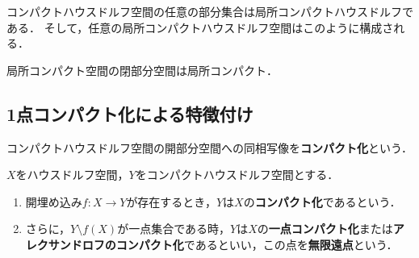 \documentclass[uplatex,dvipdfmx]{jsreport}
\begin{document}
\begin{example}
    コンパクトハウスドルフ空間の任意の部分集合は局所コンパクトハウスドルフである．
    そして，任意の局所コンパクトハウスドルフ空間はこのように構成される．
\end{example}

\begin{example}
    局所コンパクト空間の閉部分空間は局所コンパクト．
\end{example}

\subsection{1点コンパクト化による特徴付け}

\begin{tcolorbox}[colframe=ForestGreen, colback=ForestGreen!10!white,breakable,colbacktitle=ForestGreen!40!white,coltitle=black,fonttitle=\bfseries\sffamily,
title=]
    コンパクトハウスドルフ空間の開部分空間への同相写像を\textbf{コンパクト化}という．
\end{tcolorbox}

\begin{definition}
    $X$をハウスドルフ空間，$Y$をコンパクトハウスドルフ空間とする．
    \begin{enumerate}
        \item 開埋め込み$f:X\to Y$が存在するとき，$Y$は$X$の\textbf{コンパクト化}であるという．
        \item さらに，$Y\setminus f(X)$が一点集合である時，$Y$は$X$の\textbf{一点コンパクト化}または\textbf{アレクサンドロフのコンパクト化}であるといい，この点を\textbf{無限遠点}という．
    \end{enumerate}
\end{definition}
\end{document}
